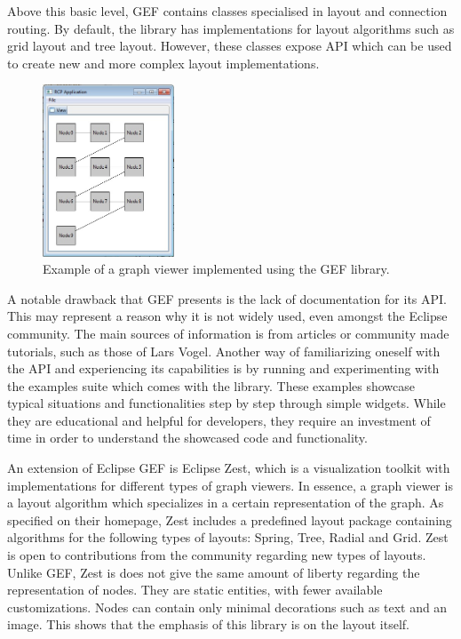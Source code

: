 Above this basic level, GEF contains classes specialised in layout and connection routing. By default, the library has implementations for 
layout algorithms such as grid layout and tree layout. However, these classes expose API which can be used to create new and more complex 
layout implementations.

\begin{figure}[ht] \centering
\includegraphics[width=0.35\textwidth]{img/relatedwork/gefexample.jpg}
\caption{Example of a graph viewer implemented using the GEF library.\protect\footnotemark} \end{figure}

A notable drawback that GEF presents is the lack of documentation for its API. This may represent a reason why it is not widely 
used, even amongst the Eclipse community. The main sources of information is from articles or community made tutorials, such as 
those of Lars Vogel. Another way of familiarizing oneself with the API and experiencing its capabilities is by running and experimenting 
with the examples suite which comes with the library. These examples showcase typical situations and functionalities step by step through 
simple widgets. While they are educational and helpful for developers, they require an investment of time in order to understand 
the showcased code and functionality.

An extension of Eclipse GEF is Eclipse Zest, which is a visualization toolkit with implementations for different types of graph 
viewers. In essence, a graph viewer is a layout algorithm which specializes in a certain representation of the graph. As 
specified on their homepage, Zest includes a predefined layout package containing algorithms for the following types of 
layouts: Spring, Tree, Radial and Grid. Zest is open to contributions from the community regarding new types of layouts.
Unlike GEF, Zest is does not give the same amount of liberty regarding the representation of nodes. They are static entities, with 
fewer available customizations. Nodes can contain only minimal decorations such as text and an image. This shows that the emphasis 
of this library is on the layout itself.

